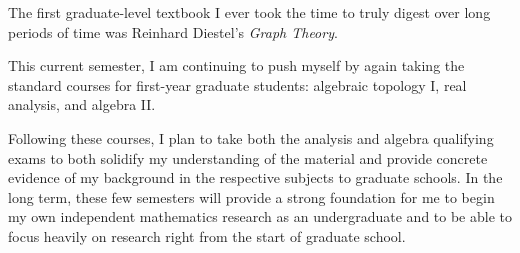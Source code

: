 \documentclass[11pt]{article}
\begin{document}

The first graduate-level textbook I ever took the time to truly digest over long periods of time was Reinhard Diestel's \emph{Graph Theory}.


%


This current semester, I am continuing to push myself by again taking the standard courses for first-year graduate students: algebraic topology I, real analysis, and algebra II.


Following these courses, I plan to take both the analysis and algebra qualifying exams to both solidify my understanding of the material and provide concrete evidence of my background in the respective subjects to graduate schools. In the long term, these few semesters will provide a strong foundation for me to begin my own independent mathematics research as an undergraduate and to be able to focus heavily on research right from the start of graduate school.



\end{document}
